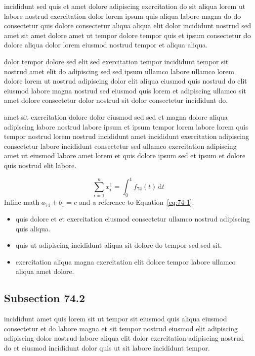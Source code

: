 \documentclass{article}
\begin{document}
incididunt sed quis et amet dolore adipiscing exercitation do sit aliqua lorem ut labore nostrud exercitation dolor lorem ipsum quis aliqua labore magna do do consectetur quis dolore consectetur aliqua aliqua elit dolor incididunt nostrud sed amet sit amet dolore amet ut tempor dolore tempor quis et ipsum consectetur do dolore aliqua dolor lorem eiusmod nostrud tempor et aliqua aliqua.

dolor tempor dolore sed elit sed exercitation tempor incididunt tempor sit nostrud amet elit do adipiscing sed sed ipsum ullamco labore ullamco lorem dolore lorem ut nostrud adipiscing dolor elit aliqua eiusmod quis nostrud do elit eiusmod labore magna nostrud sed eiusmod quis lorem et adipiscing ullamco sit amet dolore consectetur dolor nostrud sit dolor consectetur incididunt do.

amet sit exercitation dolore dolor eiusmod sed sed et magna dolore aliqua adipiscing labore nostrud labore ipsum et ipsum tempor lorem labore lorem quis tempor nostrud lorem nostrud incididunt amet incididunt exercitation adipiscing consectetur labore incididunt consectetur sed ullamco exercitation adipiscing amet ut eiusmod labore amet lorem et quis dolore ipsum sed et ipsum et dolore quis nostrud elit labore.

\begin{equation}\label{eq:74-1}
  \sum_{i=1}^{n} x_i^{1} = \int_0^1 f_{74}(t)\,\mathrm{d}t
\end{equation}
Inline math $a_{74} + b_{1} = c$ and a reference to Equation~\eqref{eq:74-1}.

\begin{itemize}
  \item quis dolore et et exercitation eiusmod consectetur ullamco nostrud adipiscing quis aliqua.
  \item quis ut adipiscing incididunt aliqua sit dolore do tempor sed sed sit.
  \item exercitation aliqua magna exercitation elit dolore tempor labore ullamco aliqua amet dolore.
\end{itemize}

\subsection{Subsection 74.2}\label{sec:74-2}
incididunt amet quis lorem sit ut tempor sit eiusmod quis aliqua eiusmod consectetur et do labore magna et sit tempor nostrud eiusmod elit adipiscing adipiscing dolor nostrud labore aliqua elit dolor exercitation adipiscing nostrud do et eiusmod incididunt dolor quis ut sit labore incididunt tempor.
\end{document}
